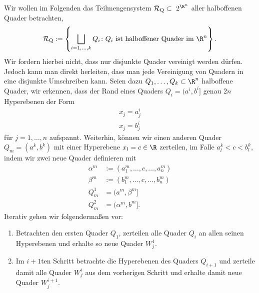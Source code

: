 \documentclass[letterpaper,10pt,english]{jupyterBook}
\begin{document}
\sphinxAtStartPar
Wir wollen im Folgenden das Teilmengensystem \(\mathcal{R}_{\text{Q}}\subset\ 2^{\R^n}\) aller halboffenen Quader betrachten,
\begin{equation*}
\begin{split}\mathcal{R}_{\text{Q}} := \left\{ \bigsqcup_{i=1,\ldots,k} Q_i \colon Q_i \text{ ist halboffener Quader im } \R^n \right\}.\end{split}
\end{equation*}
\sphinxAtStartPar
Wir fordern hierbei nicht, dass nur disjunkte Quader vereinigt werden dürfen. Jedoch kann man direkt herleiten, dass man jede Vereinigung von Quadern in eine disjunkte Umschreiben kann. Seien dazu \(Q_1,\ldots,Q_k\subset\R^n\) halboffene Quader, wir erkennen, dass der Rand eines Quaders \(Q_i=(a^i,b^i]\) genau \(2n\) Hyperebenen der Form
\begin{equation*}
\begin{split}x_j = a^i_j\\
x_j = b^i_j\end{split}
\end{equation*}
\sphinxAtStartPar
für \(j=1,\ldots,n\) aufspannt. Weiterhin, können wir einen anderen Quader \(Q_m=(a^k,b^k)\) mit einer Hyperebene \(x_l=c\in\R\) zerteilen, im Falle \(a^k_l < c < b^k_l\), indem wir zwei neue Quader definieren mit
\begin{equation*}
\begin{split}\alpha^m&:=(a^m_1,\ldots,c,\ldots,a^m_n)\\
\beta^m&:=(b^m_1,\ldots,c,\ldots,b^m_n)\\
Q_m^1&=(a^m,\beta^m]\\
Q_m^2&=(\alpha^m,b^m].\end{split}
\end{equation*}
\sphinxAtStartPar
Iterativ gehen wir folgendermaßen vor:
\begin{enumerate}
%
\item {} 
\sphinxAtStartPar
Betrachten den ersten Quader \(Q_1\), zerteilen alle Quader \(Q_i\) an allen seinen Hyperebenen und erhalte so neue Quader \(W^1_j\).

\item {} 
\sphinxAtStartPar
Im \(i+1\)ten Schritt betrachte die Hyperebenen des Quaders \(Q_{i+1}\) und zerteile damit alle Quader \(W^i_j\) aus dem vorherigen Schritt und erhalte damit neue Quader \(W^{i+1}_j\).

\end{enumerate}
\end{document}
